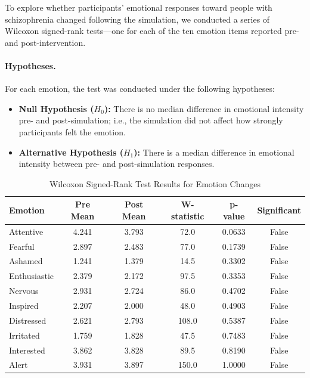 To explore whether participants’ emotional responses toward people with schizophrenia changed following the simulation, we conducted a series of Wilcoxon signed-rank tests—one for each of the ten emotion items reported pre- and post-intervention.

\paragraph{Hypotheses.} For each emotion, the test was conducted under the following hypotheses:
\begin{itemize}
    \item \textbf{Null Hypothesis ($H_0$):} There is no median difference in emotional intensity pre- and post-simulation; i.e., the simulation did not affect how strongly participants felt the emotion.
    \item \textbf{Alternative Hypothesis ($H_1$):} There is a median difference in emotional intensity between pre- and post-simulation responses.
\end{itemize}

\begin{table}[H]
\centering
\caption{Wilcoxon Signed-Rank Test Results for Emotion Changes}
\begin{tabular}{|l|c|c|c|c|c|}
\hline
\textbf{Emotion} & \textbf{Pre Mean} & \textbf{Post Mean} & \textbf{W-statistic} & \textbf{p-value} & \textbf{Significant} \\
\hline
Attentive     & 4.241 & 3.793 & 72.0  & 0.0633  & False \\
Fearful       & 2.897 & 2.483 & 77.0  & 0.1739  & False \\
Ashamed       & 1.241 & 1.379 & 14.5  & 0.3302  & False \\
Enthusiastic  & 2.379 & 2.172 & 97.5  & 0.3353  & False \\
Nervous       & 2.931 & 2.724 & 86.0  & 0.4702  & False \\
Inspired      & 2.207 & 2.000 & 48.0  & 0.4903  & False \\
Distressed    & 2.621 & 2.793 & 108.0 & 0.5387  & False \\
Irritated     & 1.759 & 1.828 & 47.5  & 0.7483  & False \\
Interested    & 3.862 & 3.828 & 89.5  & 0.8190  & False \\
Alert         & 3.931 & 3.897 & 150.0 & 1.0000  & False \\
\hline
\end{tabular}
\label{tab:wilcoxon_emotions}
\end{table}

